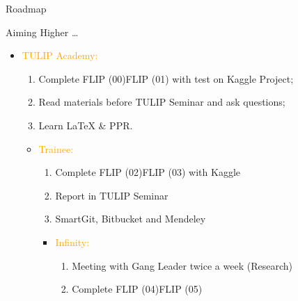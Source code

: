 \documentclass[
 size=14pt,
 paper=smartboard,  %
 mode=present, 		%
 display=slides, 	%
 style=tuliplab,  	%
 pauseslide,
 fleqn,leqno]{powerdot}
\newcommand*{\info}[4][4]{%
  \node [ annotation, #3, text width = #1em,
          inner sep = 2mm ] at (#2) {%
  \list{$\bullet$}{\topsep=0pt\itemsep=0pt\parsep=0pt
    \parskip=0pt\labelwidth=2pt\leftmargin=2pt
    \itemindent=0pt\labelsep=2pt}%
    #4
  \endlist
  };
}
\begin{document}
\begin{slide}[toc=,bm=]{Roadmap}
\begin{center}
\end{center}
\end{slide}

\begin{slide}{Aiming Higher \dots}
    \begin{itemize}
      \item \textcolor{orange}{TULIP Academy:}
       \begin{enumerate}
         \item Complete FLIP (00)\texttildelow FLIP (01) with test on Kaggle Project;
         \item Read materials before TULIP Seminar and ask questions;
         \item Learn \LaTeX{} \& PPR.
       \end{enumerate}
       \begin{itemize}
         \item \textcolor{orange}{Trainee:}
         \begin{enumerate}
           \item Complete  FLIP (02)\texttildelow FLIP (03) with Kaggle
           \item Report in TULIP Seminar
           \item SmartGit, Bitbucket and Mendeley
         \end{enumerate}
         \begin{itemize}
           \item \textcolor{orange}{Infinity:}
            \begin{enumerate}
              \item Meeting with Gang Leader twice a week (Research)
              \item Complete  FLIP (04)\texttildelow FLIP (05)
            \end{enumerate}
         \end{itemize}
       \end{itemize}

    \end{itemize}
\end{slide}
\end{document}
